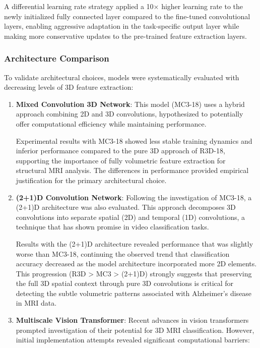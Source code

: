 \documentclass[12pt, a4paper]{article}
\begin{document}
A differential learning rate strategy applied a 10× higher learning rate to the newly initialized fully connected layer compared to the fine-tuned convolutional layers, enabling aggressive adaptation in the task-specific output layer while making more conservative updates to the pre-trained feature extraction layers.

\subsubsection{Architecture Comparison}

To validate architectural choices, models were systematically evaluated with decreasing levels of 3D feature extraction:

\begin{enumerate}
    \item \textbf{Mixed Convolution 3D Network}: This model (MC3-18) uses a hybrid approach combining 2D and 3D convolutions, hypothesized to potentially offer computational efficiency while maintaining performance.
      
      Experimental results with MC3-18 showed less stable training dynamics and inferior performance compared to the pure 3D approach of R3D-18, supporting the importance of fully volumetric feature extraction for structural MRI analysis. The differences in performance provided empirical justification for the primary architectural choice.

    \item \textbf{(2+1)D Convolution Network}: Following the investigation of MC3-18, a (2+1)D architecture was also evaluated. This approach decomposes 3D convolutions into separate spatial (2D) and temporal (1D) convolutions, a technique that has shown promise in video classification tasks.
      
      Results with the (2+1)D architecture revealed performance that was slightly worse than MC3-18, continuing the observed trend that classification accuracy decreased as the model architecture incorporated more 2D elements. This progression (R3D > MC3 > (2+1)D) strongly suggests that preserving the full 3D spatial context through pure 3D convolutions is critical for detecting the subtle volumetric patterns associated with Alzheimer's disease in MRI data.
      
    \item \textbf{Multiscale Vision Transformer}: Recent advances in vision transformers prompted investigation of their potential for 3D MRI classification. However, initial implementation attempts revealed significant computational barriers:
      

\end{enumerate}
\end{document}
